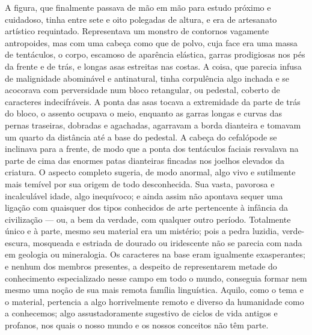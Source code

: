 A figura, que finalmente passava de mão em mão para estudo próximo e
cuidadoso, tinha entre sete e oito polegadas de altura, e era de
artesanato artístico requintado. Representava um monstro de contornos
vagamente antropoides, mas com uma cabeça como que de polvo, cuja face
era uma massa de tentáculos, o corpo, escamoso de aparência elástica,
garras prodigiosas nos pés da frente e de trás, e longas asas estreitas
nas costas. A coisa, que parecia infusa de malignidade abominável e
antinatural, tinha corpulência algo inchada e se acocorava com
perversidade num bloco retangular, ou pedestal, coberto de caracteres
indecifráveis. A ponta das asas tocava a extremidade da parte de trás
do bloco, o assento ocupava o meio, enquanto as garras longas e curvas
das pernas traseiras, dobradas e agachadas, agarravam a borda dianteira
e tomavam um quarto da distância até a base do pedestal. A cabeça do
cefalópode se inclinava para a frente, de modo que a ponta dos
tentáculos faciais resvalava na parte de cima das enormes patas
dianteiras fincadas nos joelhos elevados da criatura. O aspecto completo
sugeria, de modo anormal, algo vivo e sutilmente mais temível por sua
origem de todo desconhecida. Sua vasta, pavorosa e incalculável idade,
algo inequívoco; e ainda assim não apontava sequer uma ligação com
quaisquer dos tipos conhecidos de arte pertencente à infância da
civilização --- ou, a bem da verdade, com qualquer outro período.
Totalmente único e à parte, mesmo seu material era um mistério; pois a
pedra luzidia, verde-escura, mosqueada e estriada de dourado ou
iridescente não se parecia com nada em geologia ou mineralogia. Os
caracteres na base eram igualmente exasperantes; e nenhum dos membros
presentes, a despeito de representarem metade do conhecimento
especializado nesse campo em todo o mundo, conseguia formar nem mesmo
uma noção de sua mais remota família linguística. Aquilo, como o tema e
o material, pertencia a algo horrivelmente remoto e diverso da
humanidade como a conhecemos; algo assustadoramente sugestivo de ciclos
de vida antigos e profanos, nos quais o nosso mundo e os nossos
conceitos não têm parte.

